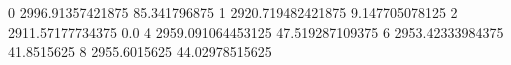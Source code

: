 0 2996.91357421875 85.341796875
1 2920.719482421875 9.147705078125
2 2911.57177734375 0.0
4 2959.091064453125 47.519287109375
6 2953.42333984375 41.8515625
8 2955.6015625 44.02978515625
